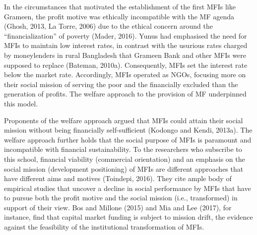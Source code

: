 \documentclass[a4paper, nobind]{templates/ociamthesis}
\begin{document}
In the circumstances that motivated the establishment of the first MFIs like Grameen, the profit motive was ethically incompatible with the MF agenda (Ghosh, 2013, La Torre, 2006) due to the ethical concern around the ``financialization'' of poverty (Mader, 2016). Yunus had emphasised the need for MFIs to maintain low interest rates, in contrast with the usurious rates charged by moneylenders in rural Bangladesh that Grameen Bank and other MFIs were supposed to replace (Bateman, 2010a). Consequently, MFIs set the interest rate below the market rate. Accordingly, MFIs operated as NGOs, focusing more on their social mission of serving the poor and the financially excluded than the generation of profits. The welfare approach to the provision of MF underpinned this model.

Proponents of the welfare approach argued that MFIs could attain their social mission without being financially self-sufficient (Kodongo and Kendi, 2013a). The welfare approach further holds that the social purpose of MFIs is paramount and incompatible with financial sustainability. To the researchers who subscribe to this school, financial viability (commercial orientation) and an emphasis on the social mission (development positioning) of MFIs are different approaches that have different aims and motives (Toindepi, 2016). They cite ample body of empirical studies that uncover a decline in social performance by MFIs that have to pursue both the profit motive and the social mission (i.e., transformed) in support of their view. Bos and Millone (2015) and Mia and Lee (2017), for instance, find that capital market funding is subject to mission drift, the evidence against the feasibility of the institutional transformation of MFIs.
\end{document}
